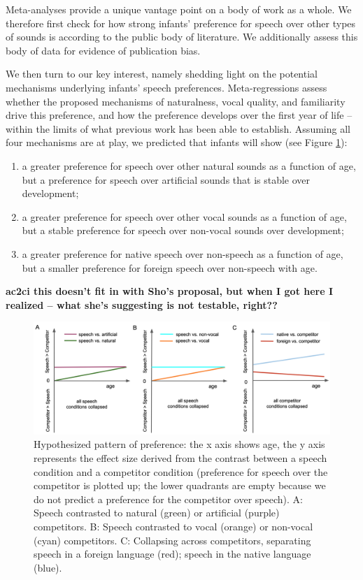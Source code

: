 \documentclass[
  english,
  man]{apa6}
\providecommand{\tightlist}{%
  \setlength{\itemsep}{0pt}\setlength{\parskip}{0pt}}
\begin{document}
Meta-analyses provide a unique vantage point on a body of work as a whole. We therefore first check for how strong infants' preference for speech over other types of sounds is according to the public body of literature. We additionally assess this body of data for evidence of publication bias.

We then turn to our key interest, namely shedding light on the potential mechanisms underlying infants' speech preferences. Meta-regressions assess whether the proposed mechanisms of naturalness, vocal quality, and familiarity drive this preference, and how the preference develops over the first year of life -- within the limits of what previous work has been able to establish. Assuming all four mechanisms are at play, we predicted that infants will show (see Figure \ref{fig:hyp}):

\begin{enumerate}
\def\labelenumi{\arabic{enumi}.}
\tightlist
\item
  a greater preference for speech over other natural sounds as a function of age, but a preference for speech over artificial sounds that is stable over development;
\item
  a greater preference for speech over other vocal sounds as a function of age, but a stable preference for speech over non-vocal sounds over development;
\item
  a greater preference for native speech over non-speech as a function of age, but a smaller preference for foreign speech over non-speech with age.
\end{enumerate}

\textbf{ac2ci this doesn't fit in with Sho's proposal, but when I got here I realized -- what she's suggesting is not testable, right??}

\begin{figure}
\includegraphics[width=6.63in]{figures_intro/hypotheses} \caption{Hypothesized pattern of preference: the x axis shows age, the y axis represents the effect size derived from the contrast between a speech condition and a competitor condition (preference for speech over the competitor is plotted up; the lower quadrants are empty because we do not predict a preference for the competitor over speech). A: Speech contrasted to natural (green) or artificial (purple) competitors. B: Speech contrasted to vocal (orange) or non-vocal (cyan) competitors. C: Collapsing across competitors, separating speech in a foreign language (red); speech in the native language (blue).}\label{fig:hyp}
\end{figure}
\end{document}
